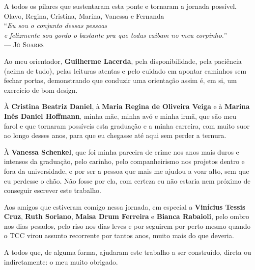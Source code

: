 \documentclass[artigo,english,brazilian]{UNISINOSmonografia}
\begin{document}
\hypersetup{pageanchor=false}
\capa
\folhaderosto

\begin{dedicatoria}
A todos os pilares que sustentaram esta ponte e tornaram a jornada possível.\\[1ex] %
Olavo, Regina, Cristina, Marina, Vanessa e Fernanda\\[4ex] %

``\textit{Eu sou o conjunto dessas pessoas\\e felizmente sou gordo o bastante pra que todas caibam no meu corpinho.}''\\[1ex]
--- \textsc{Jô Soares}
\end{dedicatoria}

\begin{agradecimentos}
Ao meu orientador, \textbf{Guilherme Lacerda}, pela disponibilidade, pela paciência (acima de tudo), pelas leituras atentas e pelo cuidado em apontar caminhos sem fechar portas, demonstrando que conduzir uma orientação assim é, em si, um exercício de bom design.

À \textbf{Cristina Beatriz Daniel}, à \textbf{Maria Regina de Oliveira Veiga} e à \textbf{Marina Inês Daniel Hoffmann}, minha mãe, minha avó e minha irmã, que são meu farol e que tornaram possíveis esta graduação e a minha carreira, com muito suor ao longo desses anos, para que eu chegasse até aqui sem perder a ternura.

À \textbf{Vanessa Schenkel}, que foi minha parceira de crime nos anos mais duros e intensos da graduação, pelo carinho, pelo companheirismo nos projetos dentro e fora da universidade, e por ser a pessoa que mais me ajudou a voar alto, sem que eu perdesse o chão. Não fosse por ela, com certeza eu não estaria nem próximo de conseguir escrever este trabalho.

Aos amigos que estiveram comigo nessa jornada, em especial a \textbf{Vinícius Tessis Cruz}, \textbf{Ruth Soriano}, \textbf{Maisa Drum Ferreira} e \textbf{Bianca Rabaioli}, pelo ombro nos dias pesados, pelo riso nos dias leves e por seguirem por perto mesmo quando o TCC virou assunto recorrente por tantos anos, muito mais do que deveria.

A todos que, de alguma forma, ajudaram este trabalho a ser construído, direta ou indiretamente: o meu muito obrigado.
\end{agradecimentos}
\end{document}

